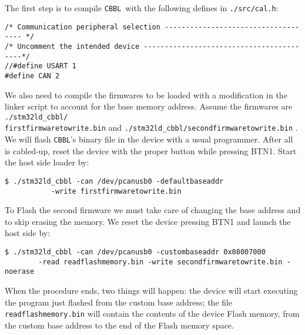 \documentclass[11pt]{article} %
\newcommand{\cbbl}{\texttt{CBBL}}
\begin{document}
The first step is to compile \cbbl\ with the following defines in \texttt{./src/cal.h}:
\begin{verbatim}
/* Communication peripheral selection ------------------------------------ */
/* Uncomment the intended device -----------------------------------------*/
//#define USART 1
#define CAN 2
\end{verbatim}
We also need to compile the firmwares to be loaded with a modification in the linker script to account for the base memory address. Assume the firmwares are \texttt{./stm32ld\_cbbl/ \\ firstfirmwaretowrite.bin} and \texttt{./stm32ld\_cbbl/secondfirmwaretowrite.bin} .
We will flash \cbbl's binary file in the device with a usual programmer. After all is cabled-up, reset the device with the proper button while pressing BTN1. Start the host side loader by:
\begin{verbatim}
$ ./stm32ld_cbbl -can /dev/pcanusb0 -defaultbaseaddr
           -write firstfirmwaretowrite.bin
\end{verbatim}
To Flash the second firmware we must take care of changing the base address and to skip erasing the memory. We reset the device pressing BTN1 and launch the host side by:
\begin{verbatim}
$ ./stm32ld_cbbl -can /dev/pcanusb0 -custombaseaddr 0x08007000
        -read readflashmemory.bin -write secondfirmwaretowrite.bin -noerase
\end{verbatim}
When the procedure ends, two things will happen: the device will start executing the program just flashed from the custom base address; the file \texttt{readflashmemory.bin} will contain the contents of the device Flash memory, from the custom base address to the end of the Flash memory space.

\end{document}
